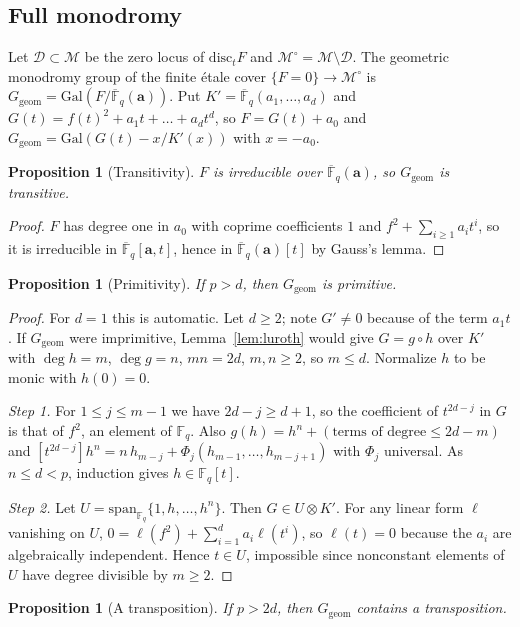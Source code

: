 \documentclass[11pt,a4paper]{article}
\newtheorem{proposition}[theorem]{Proposition}
\theoremstyle{definition}
\theoremstyle{remark}
\newcommand{\Fq}{\mathbb{F}_q}
\newcommand{\Fqbar}{\overline{\mathbb{F}}_q}
\newcommand{\Gal}{\mathrm{Gal}}
\newcommand{\disc}{\mathrm{disc}}
\newcommand{\Ggeom}{G_{\mathrm{geom}}}
\newcommand{\cM}{\mathcal{M}}
\newcommand{\ba}{\mathbf{a}}
\begin{document}
\subsection{Full monodromy}
Let $\mathcal D\subset\cM$ be the zero locus of $\disc_tF$ and $\cM^\circ=\cM\setminus\mathcal D$.
The geometric monodromy group of the finite \'etale cover $\{F=0\}\to\cM^\circ$ is
$\Ggeom=\Gal(F/\Fqbar(\ba))$. Put $K'=\Fqbar(a_1,\dots,a_d)$ and
$G(t)=f(t)^2+a_1t+\dots+a_dt^d$, so $F=G(t)+a_0$ and $\Ggeom=\Gal(G(t)-x/K'(x))$ with $x=-a_0$.

\begin{proposition}[Transitivity]\label{prop:irred}
$F$ is irreducible over $\Fqbar(\ba)$, so $\Ggeom$ is transitive.
\end{proposition}
\begin{proof}
$F$ has degree one in $a_0$ with coprime coefficients $1$ and $f^2+\sum_{i\ge1}a_it^i$, so it is
irreducible in $\Fqbar[\ba,t]$, hence in $\Fqbar(\ba)[t]$ by Gauss's lemma.
\end{proof}

\begin{proposition}[Primitivity]\label{prop:primitive}
If $p>d$, then $\Ggeom$ is primitive.
\end{proposition}

\begin{proof}
For $d=1$ this is automatic. Let $d\ge2$; note $G'\ne0$ because of the term $a_1t$. If $\Ggeom$
were imprimitive, Lemma~\ref{lem:luroth} would give $G=g\circ h$ over $K'$ with $\deg h=m$,
$\deg g=n$, $mn=2d$, $m,n\ge2$, so $m\le d$. Normalize $h$ to be monic with $h(0)=0$.

\emph{Step 1.} For $1\le j\le m-1$ we have $2d-j\ge d+1$, so the coefficient of $t^{2d-j}$ in $G$ is
that of $f^2$, an element of $\Fq$. Also $g(h)=h^n+(\text{terms of degree}\le 2d-m)$ and
$[t^{2d-j}]h^n=n\,h_{m-j}+\Phi_j(h_{m-1},\dots,h_{m-j+1})$ with $\Phi_j$ universal. As $n\le d<p$,
induction gives $h\in\Fq[t]$.

\emph{Step 2.} Let $U=\mathrm{span}_{\Fq}\{1,h,\dots,h^n\}$. Then $G\in U\otimes K'$. For any linear
form $\ell$ vanishing on $U$, $0=\ell(f^2)+\sum_{i=1}^da_i\ell(t^i)$, so $\ell(t)=0$ because the $a_i$
are algebraically independent. Hence $t\in U$, impossible since nonconstant elements of $U$ have
degree divisible by $m\ge2$.
\end{proof}

\begin{proposition}[A transposition]\label{prop:transposition}
If $p>2d$, then $\Ggeom$ contains a transposition.
\end{proposition}
\end{document}
